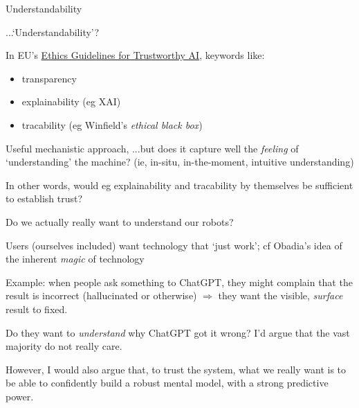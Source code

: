 \documentclass[xcolor=table,aspectratio=169]{beamer}
\begin{document}
\begin{frame}{Understandability}

    ...`Understandability'?

    \pause

    In EU's \href{https://digital-strategy.ec.europa.eu/en/library/ethics-guidelines-trustworthy-ai}{Ethics Guidelines
    for Trustworthy AI}, keywords like:

    \begin{itemize}
        \item transparency
        \item explainability (eg XAI)
        \item tracability (eg Winfield's \emph{ethical black box})
    \end{itemize}

    \pause

    Useful mechanistic approach, ...but does it capture well the \emph{feeling}
    of `understanding' the machine? (ie, in-situ, in-the-moment, intuitive
    understanding)

    \pause

    In other words, would eg explainability and tracability by themselves be
    sufficient to establish trust?

\end{frame}

\begin{frame}{Do we actually really want to understand our robots?}

    Users (ourselves included) want technology that `just work'; cf Obadia's idea of the inherent \emph{magic} of technology

    \pause

    Example: when people ask something to ChatGPT, they might complain that the
    result is incorrect (hallucinated or otherwise) $\Rightarrow$ they
    want the visible, \emph{surface} result to fixed.

    \pause

    Do they want to \emph{understand} why ChatGPT got it wrong? I'd argue that
    the vast majority do not really care.

    \pause

    However, I would also argue that, to trust the system, what we really want
    is to be able to \alert<5>{confidently} build a
    \alert<6>{robust mental model}, with a strong \alert<7>{predictive
    power}.


\end{frame}
\end{document}
